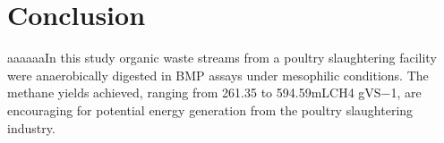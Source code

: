 \section{Conclusion}
aaaaaaIn this study organic waste streams from a poultry slaughtering facility were anaerobically digested in BMP assays under mesophilic conditions. The methane yields achieved, ranging from 261.35 to 594.59mLCH4 gVS−1, are encouraging for potential energy generation from the poultry slaughtering industry.